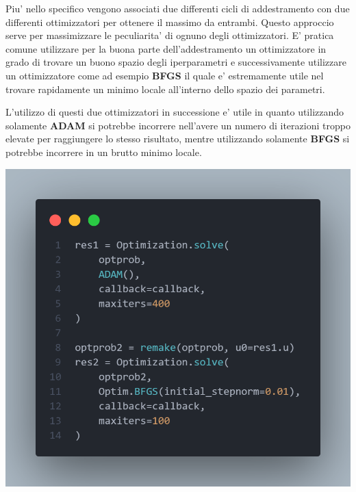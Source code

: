 Piu' nello specifico vengono associati due differenti cicli di addestramento con due differenti ottimizzatori per ottenere il massimo 
da entrambi. Questo approccio serve per massimizzare le peculiarita' di ognuno degli ottimizzatori. E' pratica comune utilizzare per la 
buona parte dell'addestramento un ottimizzatore in grado di trovare un buono spazio degli iperparametri e successivamente utilizzare 
un ottimizzatore come ad esempio \textbf{BFGS} \cite{10.1093/imamat/6.1.76} \cite{35d0019d-775a-3628-b0b4-67be112e346b} \cite{10.1093/comjnl/13.3.317} \cite{e3177091-3094-3792-9d61-0ab445735ddb}
il quale e' estremamente utile nel trovare rapidamente un minimo locale all'interno dello spazio dei parametri.

L'utilizzo di questi due ottimizzatori in successione e' utile in quanto utilizzando solamente \textbf{ADAM} si potrebbe 
incorrere nell'avere un numero di iterazioni troppo elevate per raggiungere lo stesso risultato, mentre utilizzando solamente \textbf{BFGS} si 
potrebbe incorrere in un brutto minimo locale.

\begin{minipage}{\linewidth}
	\centering
	\includegraphics[width=\textwidth]{img/optimizers_example.png}
	\label{fig:two_otpimizers}
\end{minipage}

